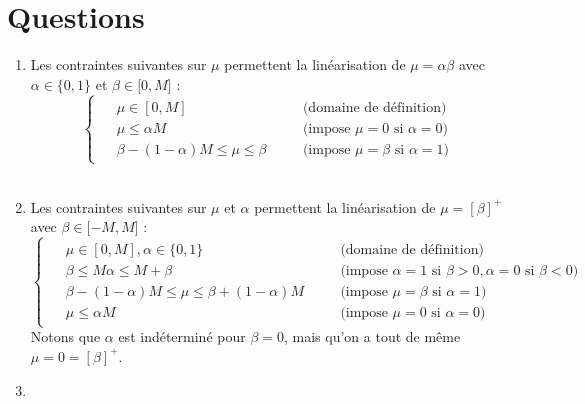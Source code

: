 \documentclass[a4paper,12pt]{article}
\begin{document}
\section{Questions}
\begin {enumerate}
\item { 
    Les contraintes suivantes sur $\mu$ permettent la linéarisation de $\mu = \alpha \beta$ avec $\alpha \in \lbrace 0,1 \rbrace$ et $\beta \in \lbrack 0, M \rbrack$ : 
    \begin{equation*}
        \begin{cases}
            \begin{alignedat}{2}
                &\mu \in [0,M] && \quad \text{(domaine de définition)}  \\ 
                &\mu \leq \alpha M && \quad  \text{(impose } \mu = 0 \text{ si }  \alpha = 0 \text{)}\\
                &\beta - (1 - \alpha)M \leq \mu \leq \beta && \quad \text{(impose } \mu = \beta \text{ si }  \alpha = 1 \text{)}
            \end{alignedat}
        \end{cases}
    \end{equation*}
    }
\\
\item {
    Les contraintes suivantes sur $\mu$ et $\alpha$ permettent la linéarisation de $\mu = [\beta]^{+}$ avec $\beta \in \lbrack -M, M \rbrack$ : 
    \begin{equation*}
        \begin{cases}
            \begin{alignedat}{2}
                &\mu \in [0,M], \alpha \in \lbrace 0,1 \rbrace && \quad \text{(domaine de définition)} \\ 
                &\beta \leq M \alpha \leq M + \beta && \quad \text{(impose } \alpha = 1 \text{ si }  \beta > 0, \alpha = 0 \text{ si } \beta < 0 \text{)} \\
                &\beta - (1-\alpha)M \leq \mu \leq \beta + (1-\alpha)M && \quad \text{(impose } \mu = \beta \text{ si }  \alpha = 1 \text{)} \\
                &\mu \leq \alpha M && \quad \text{(impose } \mu = 0 \text{ si }  \alpha = 0 \text{)}
            \end{alignedat}
        \end{cases}
    \end{equation*}
    Notons que $\alpha$ est indéterminé pour $\beta = 0$, mais qu'on a tout de même $\mu = 0= [\beta]^{+}$.
}
\item {
}
\end{enumerate}
\end{document}
